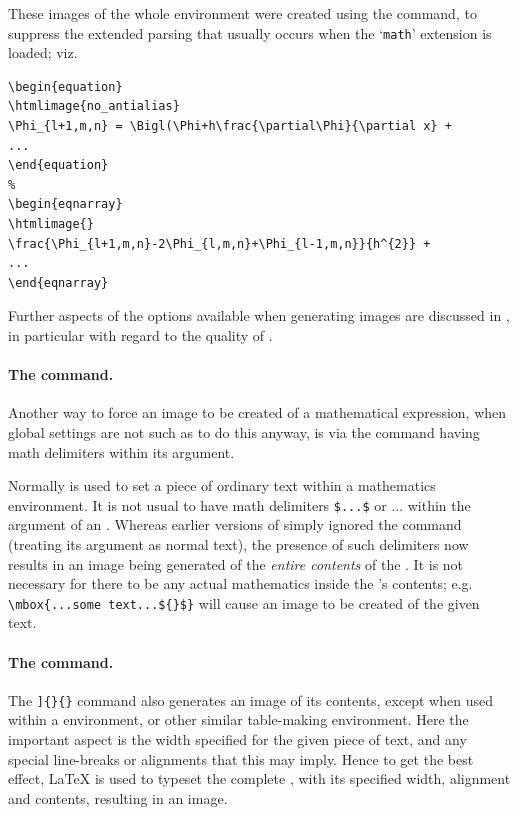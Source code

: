 \noindent
These images of the whole environment were created 
using the  command, to suppress the extended parsing 
that usually occurs when the `\texttt{math}' extension is loaded; viz.
%
\begin{small}
\begin{verbatim}
\begin{equation}
\htmlimage{no_antialias}
\Phi_{l+1,m,n} = \Bigl(\Phi+h\frac{\partial\Phi}{\partial x} +
...
\end{equation}
%
\begin{eqnarray}
\htmlimage{}
\frac{\Phi_{l+1,m,n}-2\Phi_{l,m,n}+\Phi_{l-1,m,n}}{h^{2}} +
...
\end{eqnarray}
\end{verbatim}
\end{small}
Further aspects of the options available when generating images 
are discussed in , in particular 
with regard to the quality of .



%
\paragraph*{The  command.}
Another way to force an image to be created of a mathematical expression,
when global settings are not such as to do this anyway, 
is via the  command having math delimiters within its argument.

Normally  is used to set a piece of ordinary text within a 
mathematics environment. It is not usual to have math delimiters 
\texttt{\$...\$} or \Lc{(}...\Lc{)} within the argument of an . 
Whereas earlier versions of \latextohtml{} simply ignored the  
command (treating its argument as normal text), 
the presence of such delimiters now results in an image being
generated of the \emph{entire contents} of the .
It is not necessary for there to be any actual mathematics inside
the 's contents;\html{\\}
e.g. \verb|\mbox{...some text...${}$}|
will cause an image to be created of the given text.


%
\paragraph*{The  command.}
The \Lc{parbox[}\verb|]{|\verb|}{|\verb|}| 
command also generates an image of its contents,
except when used within a  environment, or other
similar table-making environment.
Here the important aspect is the width specified for the given
piece of text, and any special line-breaks or alignments that
this may imply. Hence to get the best effect, \LaTeX{} is used
to typeset the complete , with its specified width,
alignment and contents, resulting in an image.


